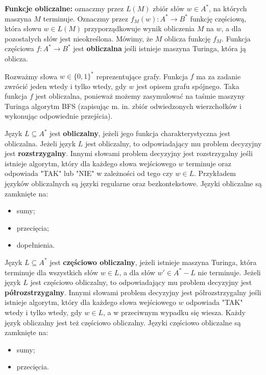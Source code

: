 \textbf{Funkcje obliczalne:} oznaczmy przez $L(M)$ zbiór słów $w \in A^*$, na których maszyna $M$ terminuje. Oznaczmy przez $f_M(w): A^* \to B^*$ funkcję częściową, która słowu $w \in L(M)$ przyporządkowuje wynik obliczenia $M$ na $w$, a dla pozostałych słów jest nieokreślona. Mówimy, że $M$ oblicza funkcję $f_M$. Funkcja częściowa $f: A^* \to B^*$ jest \textbf{obliczalna} jeśli istnieje maszyna Turinga, która ją oblicza.

\begin{example}
    Rozważmy słowa $w \in \{0, 1\}^*$ reprezentujące grafy. Funkcja $f$ ma za zadanie zwrócić jeden wtedy i tylko wtedy, gdy $w$ jest opisem grafu spójnego. Taka funkcja $f$ jest obliczalna, ponieważ możemy zasymulować na taśmie maszyny Turinga algorytm BFS (zapisując m. in. zbiór odwiedzonych wierzchołków i wykonując odpowiednie przejścia).
\end{example}

Język $L \subseteq A^*$ jest \textbf{obliczalny}, jeżeli jego funkcja charakterystyczna jest obliczalna. Jeżeli język $L$ jest obliczalny, to odpowiadający mu problem decyzyjny jest \textbf{rozstrzygalny}. Innymi słowami problem decyzyjny jest rozstrzygalny jeśli istnieje algorytm, który dla każdego słowa wejściowego $w$ terminuje oraz odpowiada "TAK" lub "NIE" w zależności od tego czy $w \in L$. Przykładem języków obliczalnych są języki regularne oraz bezkontekstowe. Języki obliczalne są zamknięte na:
\begin{itemize}
    \item sumy;
    \item przecięcia;
    \item dopełnienia.
\end{itemize}

Język $L \subseteq A^*$ jest \textbf{częściowo obliczalny}, jeżeli istnieje maszyna Turinga, która terminuje dla wszystkich słów $w \in L$, a dla słów $w' \in A^* - L$ nie terminuje. Jeżeli język $L$ jest częściowo obliczalny, to odpowiadający mu problem decyzyjny jest \textbf{półrozstrzygalny}. Innymi słowami problem decyzyjny jest półrozstrzygalny jeśli istnieje algorytm, który dla każdego słowa wejściowego $w$ odpowiada "TAK" wtedy i tylko wtedy, gdy $w \in L$, a w przeciwnym wypadku się wiesza. Każdy język obliczalny jest też częściowo obliczalny. Języki częściowo obliczalne są zamknięte na:
\begin{itemize}
    \item sumy;
    \item przecięcia.
\end{itemize}

